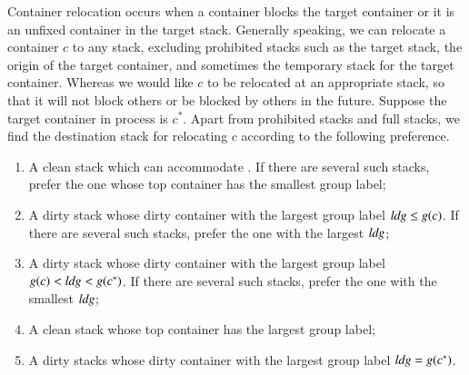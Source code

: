 \documentclass[review,3p,times,authoryear,12pt]{elsarticle}
\begin{document}
Container relocation occurs when a container blocks the target container or it is an unfixed container in the target stack. Generally speaking, we can relocate a container $c$ to any stack, excluding prohibited stacks such as the target stack, the origin of the target container, and sometimes the temporary stack for the target container. Whereas we would like $c$ to be relocated at an appropriate stack, so that it will not block others or be blocked by others in the future. Suppose the target container in process is $c^*$. Apart from prohibited stacks and full stacks, we find the destination stack for relocating $c$ according to the following preference.
\begin{enumerate}[1.]
\item A clean stack which can accommodate . If there are several such stacks, prefer the one whose top container has the smallest group label;

\item A dirty stack whose dirty container with the largest group label $\id{ldg}\le g(c)$. If there are several such stacks, prefer the one with the largest $\id{ldg}$;

\item A dirty stack whose dirty container with the largest group label $g(c)<\id{ldg}<g(c^*)$. If there are several such stacks, prefer the one with the smallest $\id{ldg}$;

\item A clean stack whose top container has the largest group label;

\item A dirty stacks whose dirty container with the largest group label $\id{ldg}=g(c^*)$.
\end{enumerate}
\end{document}

